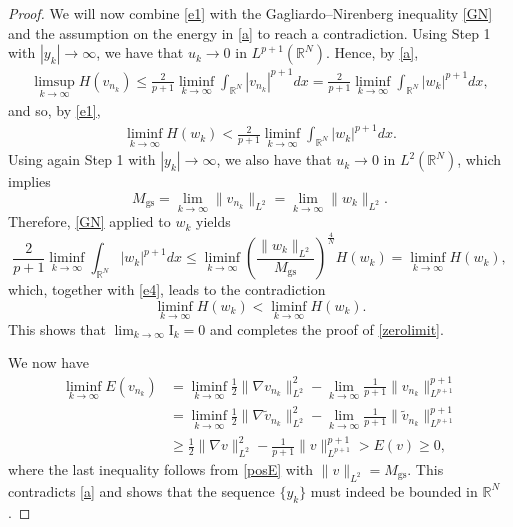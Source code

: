 \documentclass[reqno]{amsart}
\newcommand{\real}{\mathbb{R}}
\newcommand{\rn}{\real^N}
\newcommand{\wt}{\widetilde}
\let\le=\leqslant
\let\ge= \geqslant
\theoremstyle{plain}
\theoremstyle{definition}
\numberwithin{equation}{section}
\begin{document}
\begin{proof}
We will now combine \eqref{e1} with the Gagliardo--Nirenberg inequality \eqref{GN} and
the assumption on the energy in \eqref{a} to reach a contradiction.
Using Step 1 with $|y_k|\to\infty$, we have that
$u_k\to0$ in $L^{p+1}(\rn)$.
Hence, by \eqref{a},
\begin{align*}
\limsup_{k\rightarrow\infty}H(v_{n_k})\le\frac{2}{p+1}\liminf_{k\rightarrow\infty}\int_{\rn}|v_{n_k}|^{p+1}dx
=\frac{2}{p+1}\liminf_{k\rightarrow\infty}\int_{\rn}|w_k|^{p+1}dx,
\end{align*}
and so, by \eqref{e1},
\begin{align} \label{e4}
\liminf_{k\rightarrow\infty}H(w_k)<\frac{2}{p+1}\liminf_{k\rightarrow\infty}\int_{\rn}|w_k|^{p+1}dx.
\end{align}
Using again Step 1 with $|y_k|\to\infty$, we also have that $u_k\to0$ in $L^2(\rn)$,
which implies
\[
M_\mathrm{gs}=\lim_{k\rightarrow\infty}\|v_{n_k}\|_{L^2}
=\lim_{k\rightarrow\infty}\|w_k\|_{L^2}.
\]
Therefore, \eqref{GN} applied to $w_k$ yields 
\[
\frac{2}{p+1}\liminf_{k\rightarrow\infty}\int_{\rn}|w_k|^{p+1}dx
\le\liminf_{k\rightarrow\infty}\left(\frac{\|w_k\|_{L^2}}{M_\mathrm{gs}}\right)^{\frac4N}H(w_k)
= \liminf_{k\rightarrow\infty}H(w_k),
\]
which, together with \eqref{e4}, leads to the contradiction
\[
\liminf_{k\rightarrow\infty}H(w_k)<\liminf_{k\rightarrow\infty}H(w_k).
\]
This shows that $\lim_{k\to\infty}\mathrm{I}_k=0$ and completes the proof of \eqref{zerolimit}.

We now have
\begin{align*}
\liminf_{k\to\infty} E(v_{n_k})
&=\liminf_{k\to\infty} \frac12 \|\nabla v_{n_k}\|_{L^2}^2
-\lim_{k\to\infty} \frac{1}{p+1} \| v_{n_k}\|_{L^{p+1}}^{p+1}\\
&=\liminf_{k\to\infty} \frac12 \|\nabla \wt{v}_{n_k}\|_{L^2}^2
-\lim_{k\to\infty} \frac{1}{p+1} \| \wt{v}_{n_k}\|_{L^{p+1}}^{p+1}\\
&\ge \frac12 \|\nabla v\|_{L^2}^2 - \frac{1}{p+1} \|v\|_{L^{p+1}}^{p+1}>E(v)\ge 0,
\end{align*}
where the last inequality follows from \eqref{posE} with $\|v\|_{L^2}=M_\mathrm{gs}$.
This contradicts \eqref{a} and shows that the sequence $\{y_k\}$ must indeed be bounded in $\rn$.


\end{proof}
\end{document}
